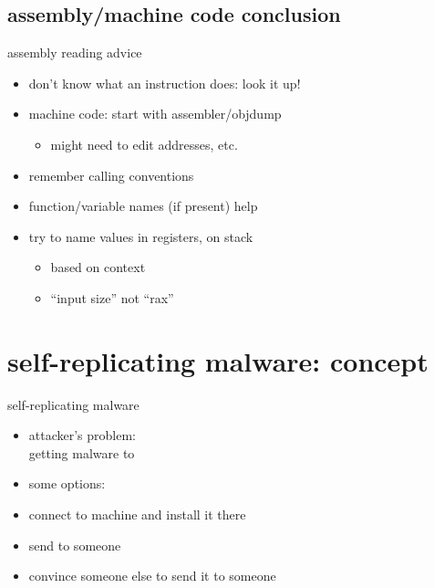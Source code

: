 \subsection{assembly/machine code conclusion}

\begin{frame}{assembly reading advice}
    \begin{itemize}
    \item don't know what an instruction does: look it up!
    \item machine code: start with assembler/objdump
        \begin{itemize}
        \item might need to edit addresses, etc.
        \end{itemize}
    \item remember calling conventions
    \item function/variable names (if present) help
    \item try to name values in registers, on stack
        \begin{itemize}
        \item based on context
        \item ``input size'' not ``rax''
        \end{itemize}
    \end{itemize}
\end{frame}




\section{self-replicating malware: concept}

\begin{frame}{self-replicating malware}
    \begin{itemize}
    \item attacker's problem: \\getting malware to 
    \item some options:
    \vspace{.5cm}
    \item connect to machine and install it there
    \item send to someone
    \item convince someone else to send it to someone
    \end{itemize}
\end{frame}

